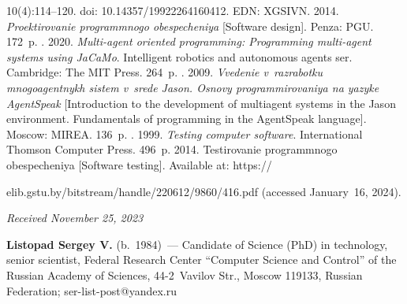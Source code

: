 \begin{multicols}{2}
{{\begin{thebibliography}{99}
10(4):114--120. doi: 10.14357/19922264160412. EDN: XGSIVN.
    2014. \textit{Pro\-ek\-ti\-ro\-va\-nie pro\-gram\-mno\-go obes\-pe\-che\-niya} 
[Software design]. Penza: PGU. 172~p.
   . 2020. \textit{Multi-agent 
oriented programming: Programming multi-agent systems using JaCaMo}. Intelligent robotics and 
autonomous agents ser. Cambridge: The MIT Press. 264~p.
   . 2009. \textit{Vve\-de\-nie v~raz\-ra\-bot\-ku 
mno\-go\-agent\-nykh sis\-tem v~sre\-de Jason. Osno\-vy pro\-gram\-mi\-ro\-va\-niya na yazy\-ke AgentSpeak} 
[Introduction to the development of multiagent systems in the Jason environment. Fundamentals of 
programming in the AgentSpeak language]. Moscow: MIREA. 136~p.
   . 1999. \textit{Testing computer software}. 
International Thomson Computer Press. 496~p.
    2014. Tes\-ti\-ro\-va\-nie pro\-gram\-mno\-go obes\-pe\-che\-niya [Software testing]. 
Available at: {\sf https://}\linebreak\vspace*{-12pt}

\columnbreak

\noindent
 {\sf elib.gstu.by/bitstream/handle/220612/9860/416.pdf} (accessed January~16, 
2024).
   
  \end{thebibliography}

 }
 }

\end{multicols}

\vspace*{-6pt}

\hfill{\small\textit{Received November 25, 2023}} 

     
     \Contrl
     
   
   \noindent
   \textbf{Listopad Sergey V.} (b.\ 1984)~--- Candidate of Science (PhD) in technology, senior 
scientist, Federal Research Center ``Computer Science and Control'' of the Russian Academy of 
Sciences, 44-2~Vavilov Str., Moscow 119133, Russian Federation;  
\mbox{ser-list-post@yandex.ru}
   
    
\label{end\stat}

\renewcommand{\bibname}{\protect\rm Литература} 